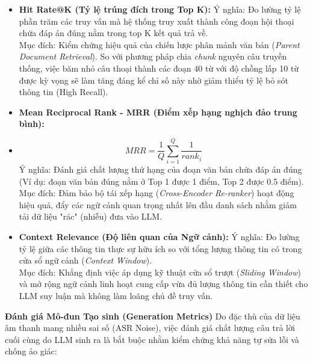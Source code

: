 \begin{itemize}[leftmargin=*, label={}]
    \item \textbf{Hit Rate@K (Tỷ lệ trúng đích trong Top K):}
    Ý nghĩa: Đo lường tỷ lệ phần trăm các truy vấn mà hệ thống truy xuất thành công đoạn hội thoại chứa đáp án đúng nằm trong top K kết quả trả về. \\
    Mục đích: Kiểm chứng hiệu quả của chiến lược phân mảnh văn bản (\textit{Parent Document Retrieval}). So với phương pháp chia \textit{chunk} nguyên câu truyền thống, việc băm nhỏ câu thoại thành các đoạn 40 từ với độ chồng lấp 10 từ được kỳ vọng sẽ làm tăng đáng kể chỉ số này nhờ giảm thiểu tỷ lệ bỏ sót thông tin (High Recall).

    \item \textbf{Mean Reciprocal Rank - MRR (Điểm xếp hạng nghịch đảo trung bình):}
    \item  \[
    MRR = \frac{1}{Q} \sum_{i=1}^{Q} \frac{1}{rank_i}
    \]
    Ý nghĩa: Đánh giá chất lượng thứ hạng của đoạn văn bản chứa đáp án đúng (Ví dụ: đoạn văn bản đúng nằm ở Top 1 được 1 điểm, Top 2 được 0.5 điểm). \\
    Mục đích: Đảm bảo bộ tái xếp hạng (\textit{Cross-Encoder Re-ranker}) hoạt động hiệu quả, đẩy các ngữ cảnh quan trọng nhất lên đầu danh sách nhằm giảm tải dữ liệu "rác" (nhiễu) đưa vào LLM.

    \item \textbf{Context Relevance (Độ liên quan của Ngữ cảnh):}
    Ý nghĩa: Đo lường tỷ lệ giữa các thông tin thực sự hữu ích so với tổng lượng thông tin có trong cửa sổ ngữ cảnh (\textit{Context Window}). \\
    Mục đích: Khẳng định việc áp dụng kỹ thuật cửa sổ trượt (\textit{Sliding Window}) và mở rộng ngữ cảnh linh hoạt cung cấp vừa đủ lượng thông tin cần thiết cho LLM suy luận mà không làm loãng chủ đề truy vấn.
\end{itemize}

\textbf{Đánh giá Mô-đun Tạo sinh (Generation Metrics)}
Do đặc thù của dữ liệu âm thanh mang nhiều sai số (ASR Noise), việc đánh giá chất lượng câu trả lời cuối cùng do LLM sinh ra là bắt buộc nhằm kiểm chứng khả năng tự sửa lỗi và chống ảo giác:

